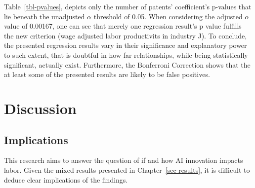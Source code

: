 \documentclass[
  11,
  a4paperpaper,
]{article}
\let\oldsection\section
\renewcommand\section{\clearpage\oldsection}
\begin{document}

Table~\ref{tbl-pvalues}, depicts only the number of patents'
coefficient's p-values that lie beneath the unadjusted \(\alpha\)
threshold of 0.05. When considering the adjusted \(\alpha\) value of
0.00167, one can see that merely one regression result's p value
fulfills the new criterion (wage adjusted labor productivits in industry
J). To conclude, the presented regression results vary in their
significance and explanatory power to such extent, that is doubtful in
how far relationships, while being statistically significant, actually
exist. Furthermore, the Bonferroni Correction shows that the at least
some of the presented results are likely to be false positives.

\section{Discussion}\label{sec-discussion}

\subsection{Implications}\label{implications}

This research aims to answer the question of if and how AI innovation
impacts labor. Given the mixed results presented in
Chapter~\ref{sec-results}, it is difficult to deduce clear implications
of the findings.

\end{document}
